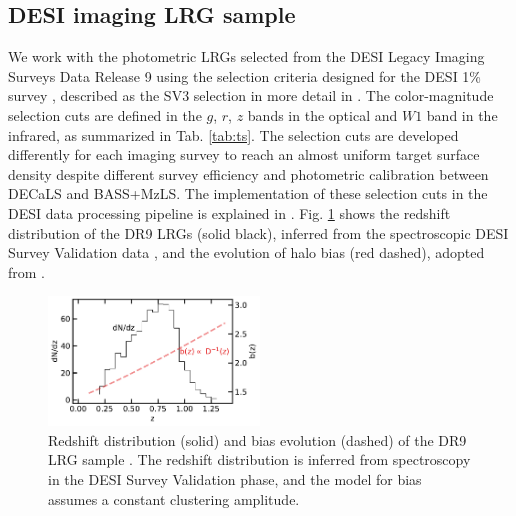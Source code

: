 \subsection{DESI imaging LRG sample}
We work with the photometric LRGs selected from the DESI Legacy Imaging Surveys Data Release 9 \citep[DR9;][]{dey2018overview} using the selection criteria designed for the DESI 1\% survey , described as the SV3 selection in more detail in \cite{zhou2022target}. The color-magnitude selection cuts are defined in the $g$, $r$, $z$ bands in the optical and $W1$ band in the infrared, as summarized in Tab. \ref{tab:ts}. The selection cuts are developed differently for each imaging survey to reach an almost uniform target surface density despite different survey efficiency and photometric calibration between DECaLS and BASS+MzLS. The implementation of these selection cuts in the DESI data processing pipeline is explained in \cite{myers2022}. Fig. \ref{fig:nz} shows the redshift distribution of the DR9 LRGs (solid black), inferred from the spectroscopic DESI Survey Validation data , and the evolution of halo bias (red dashed), adopted from \cite{zhou2021clustering}.

\begin{figure}
 \centering
 \includegraphics[width=0.5\textwidth]{figures/nz_lrg.pdf}
 \caption{Redshift distribution (solid) and bias evolution (dashed) of the DR9 LRG sample \citep{zhou2021clustering, zhou2022target}. The redshift distribution is inferred from spectroscopy in the DESI Survey Validation phase, and the model for bias assumes a constant clustering amplitude.}
 \label{fig:nz}
\end{figure}

